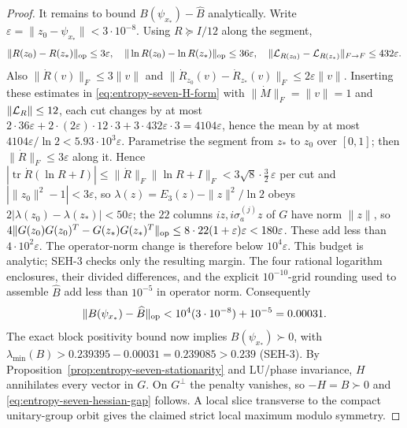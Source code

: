 \begin{proof}
It remains to bound \(B(\psi_{x_*})-\widehat B\) analytically. Write \(\varepsilon=\|z_0-\psi_{x_*}\|<3\cdot10^{-8}\).
Using \(R\succeq I/12\) along the segment,
\[
 \|R(z_0)-R(z_*)\|_{\rm op}\le3\varepsilon,\quad
 \|\ln R(z_0)-\ln R(z_*)\|_{\rm op}\le36\varepsilon,\quad
 \|{\cal L}_{R(z_0)}-{\cal L}_{R(z_*)}\|_{F\to F}
 \le432\varepsilon.
\]
Also \(\|\dot R(v)\|_F\le3\|v\|\) and
\(\|\dot R_{z_0}(v)-\dot R_{z_*}(v)\|_F
\le2\varepsilon\|v\|\). Inserting these estimates in
\eqref{eq:entropy-seven-H-form} with \(\|\dot M\|_F=\|v\|=1\) and
\(\|{\cal L}_R\|\le12\), each cut changes by at most
\(2\cdot36\varepsilon+2\cdot(2\varepsilon)\cdot12\cdot3+3\cdot432\varepsilon\cdot3
=4104\varepsilon\), hence the mean by at most
\(4104\varepsilon/\ln2<5.93\cdot10^3\varepsilon\). Parametrise the segment from $z_*$ to $z_0$ over $[0,1]$;
then $\|\dot R\|_F\le3\varepsilon$ along it. Hence
\(|\operatorname{tr}\dot R(\ln R+I)|\le\|\dot R\|_F\|\ln R+I\|_F<3\sqrt8\cdot\frac32\,\varepsilon\) per cut and
\(|\|z_0\|^2-1|<3\varepsilon\), so \(\lambda(z)=E_3(z)-\|z\|^2/\ln2\) obeys \(2|\lambda(z_0)-\lambda(z_*)|<50\varepsilon\); the \(22\) columns \(iz,i\sigma_a^{(j)}z\)
of \(G\) have norm \(\|z\|\), so \(4\|G(z_0)G(z_0)^T-G(z_*)G(z_*)^T\|_{\rm op}\le8\cdot22(1+\varepsilon)\varepsilon<180\varepsilon\).
These add less than \(4\cdot10^2\varepsilon\). The operator-norm change is therefore below
\(10^4\varepsilon\). This budget is analytic; SEH-3 checks only the resulting margin.
The four rational logarithm enclosures, their divided differences,
and the explicit \(10^{-10}\)-grid rounding used to assemble
\(\widehat B\) add less than \(10^{-5}\) in operator norm.
Consequently
\[
 \|B(\psi_{x_*})-\widehat B\|_{\rm op}
 <10^4(3\cdot10^{-8})+10^{-5}=0.00031.
\]
The exact block positivity bound now implies \(B(\psi_{x_*})\succ0\), with
\(\lambda_{\min}(B)>0.239395-0.00031=0.239085>0.239\) (SEH-3).
By Proposition~\ref{prop:entropy-seven-stationarity} and LU/phase
invariance, \(H\) annihilates every vector in \(G\). On \(G^\perp\)
the penalty vanishes, so \(-H=B\succ0\) and
\eqref{eq:entropy-seven-hessian-gap} follows. A local slice
transverse to the compact unitary-group orbit gives the claimed
strict local maximum modulo symmetry.
\end{proof}


